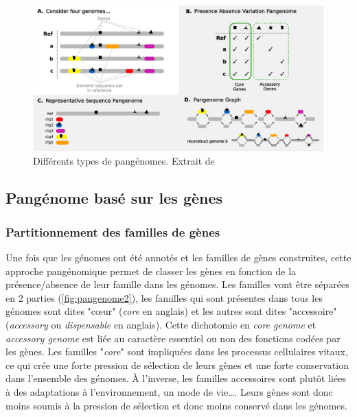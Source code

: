 \begin{figure}[htbp]
    \centering
    \includegraphics[width=0.8\linewidth]{images/pangenomeTypes.jpeg}
    \caption[Différents types de pangénomes]{Différents types de pangénomes. Extrait de \cite{matthews_gentle_2024}}
    \label{fig:panType}
\end{figure}

\subsection{Pangénome basé sur les gènes}

\subsubsection{Partitionnement des familles de gènes}

Une fois que les génomes ont été annotés et les familles de gènes construites, cette approche pangénomique permet de classer les gènes en fonction de la présence/absence de leur famille dans les génomes. Les familles vont être séparées en 2 parties (\autoref{fig:pangenome2}), les familles qui sont présentes dans tous les génomes sont dites "c\oe ur" (\textit{core} en anglais) et les autres sont dites "accessoire" (\textit{accessory} ou \textit{dispensable} en anglais). Cette dichotomie en \textit{core genome} et \textit{accessory genome} est liée au caractère essentiel ou non des fonctions codées par les gènes. Les familles "\textit{core}" sont impliquées dans les processus cellulaires vitaux, ce qui crée une forte pression de sélection de leurs gènes et une forte conservation dans l'ensemble des génomes. À l'inverse, les familles accessoires sont plutôt liées à des adaptations à l'environnement, un mode de vie\dots. Leurs gènes sont donc moins soumis à la pression de sélection et donc moins conservé dans les génomes.

